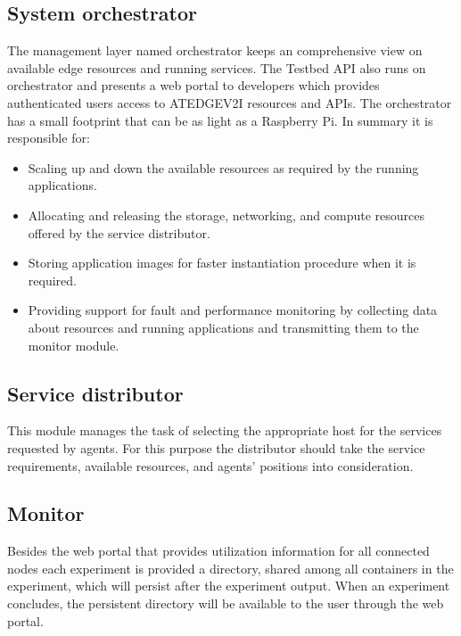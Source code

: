 \documentclass[conference]{IEEEtran}
\begin{document}
\subsection{System orchestrator}
\par The management layer named orchestrator keeps an comprehensive view on available edge resources and running services. The Testbed API also runs on orchestrator and presents a web portal to developers which provides authenticated users access to ATEDGEV2I resources and APIs. The orchestrator has a small footprint that can be as light as a Raspberry Pi. In summary it is responsible for:
\begin{itemize}
\item Scaling up and down the available resources as required by the running applications. 
\item Allocating and releasing the storage, networking, and compute resources offered by the service distributor.
\item Storing application images for faster instantiation procedure when it is required.
\item Providing support for fault and performance monitoring by collecting data about resources and running applications
and transmitting them to the monitor module.
\end{itemize}

\subsection{Service distributor}
\par This module manages the task of selecting the appropriate host for the services requested by agents. For this purpose the distributor should take the service requirements, available resources, and agents' positions into consideration.

\subsection{Monitor}
\par Besides the web portal that provides utilization information for all connected nodes each experiment is provided a directory, shared among all containers in the experiment, which will persist after the experiment output. When an experiment concludes, the persistent directory will be available to the user through the web portal.
\end{document}
